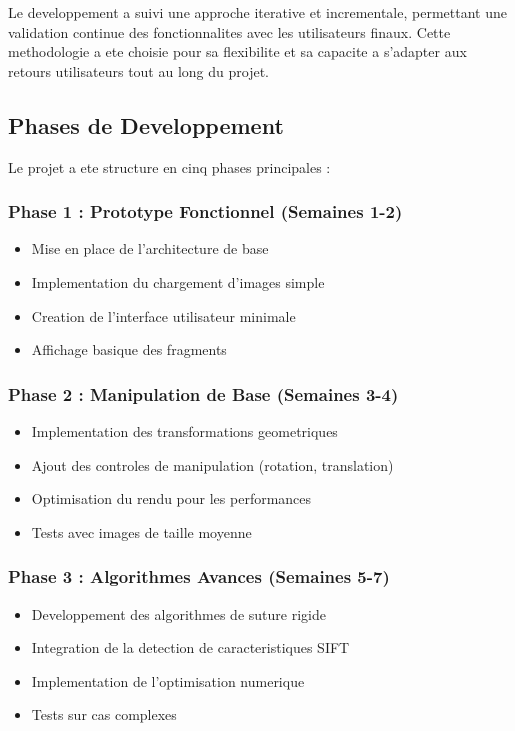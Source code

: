 \documentclass[12pt,a4paper]{article}
\begin{document}
Le developpement a suivi une approche iterative et incrementale, permettant une validation continue des fonctionnalites avec les utilisateurs finaux. Cette methodologie a ete choisie pour sa flexibilite et sa capacite a s'adapter aux retours utilisateurs tout au long du projet.

\subsection{Phases de Developpement}

Le projet a ete structure en cinq phases principales :

\subsubsection{Phase 1 : Prototype Fonctionnel (Semaines 1-2)}
\begin{itemize}
\item Mise en place de l'architecture de base
\item Implementation du chargement d'images simple
\item Creation de l'interface utilisateur minimale
\item Affichage basique des fragments
\end{itemize}

\subsubsection{Phase 2 : Manipulation de Base (Semaines 3-4)}
\begin{itemize}
\item Implementation des transformations geometriques
\item Ajout des controles de manipulation (rotation, translation)
\item Optimisation du rendu pour les performances
\item Tests avec images de taille moyenne
\end{itemize}

\subsubsection{Phase 3 : Algorithmes Avances (Semaines 5-7)}
\begin{itemize}
\item Developpement des algorithmes de suture rigide
\item Integration de la detection de caracteristiques SIFT
\item Implementation de l'optimisation numerique
\item Tests sur cas complexes
\end{itemize}
\end{document}
